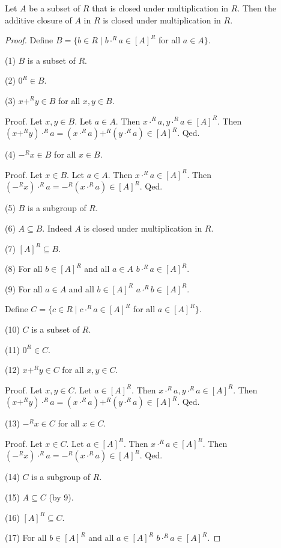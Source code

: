 \documentclass[english,11pt]{article}
\begin{document}
\begin{forthel}
\begin{lemma}
Let $A$ be a subset of $R$ that is closed under multiplication in $R$.
Then the additive closure of $A$ in $R$ is closed under multiplication in $R$.
\end{lemma}

\begin{proof}
Define $B = \{b \in R \mid b \cdot^{R} a \in [A]^{R}$ for all $a \in A\}$.

(1) $B$ is a subset of $R$.

(2) $0^{R} \in B$.

(3) $x +^{R} y \in B$ for all $x,y \in B$.

Proof.
Let $x,y \in B$.
Let $a \in A$. Then $x \cdot^{R} a, y \cdot^{R} a \in [A]^{R}$.
Then $(x +^{R} y) \cdot^{R} a = (x \cdot^{R} a) +^{R} (y \cdot^{R} a) \in [A]^{R}$.
Qed.

(4) $-^{R} x \in B$ for all $x \in B$.

Proof.
Let $x \in B$.
Let $a \in A$. Then $x \cdot^{R} a \in [A]^{R}$.
Then $(-^{R} x) \cdot^{R} a = -^{R} (x\cdot^{R} a) \in [A]^{R}$.
Qed.

(5) $B$ is a subgroup of $R$.

(6) $A \subseteq B$. Indeed $A$ is closed under multiplication in $R$.

(7) $[A]^{R} \subseteq B$.

(8) For all $b \in [A]^{R}$ and all $a \in A$ $b \cdot^{R} a \in [A]^{R}$.

(9) For all $a \in A$ and all $b \in [A]^{R}$  $a \cdot^{R} b \in [A]^{R}$.

Define $C = \{c \in R \mid c \cdot^{R} a \in [A]^{R}$ for all $a \in [A]^{R}\}$.

(10) $C$ is a subset of $R$.

(11) $0^{R} \in C$.

(12) $x +^{R} y \in C$ for all $x,y \in C$.

Proof.
Let $x,y \in C$.
Let $a \in [A]^{R}$. Then $x \cdot^{R} a, y \cdot^{R} a \in [A]^{R}$.
Then $(x +^{R} y) \cdot^{R} a = (x \cdot^{R} a) +^{R} (y \cdot^{R} a) \in [A]^{R}$.
Qed.

(13) $-^{R} x \in C$ for all $x \in C$.

Proof.
Let $x \in C$.
Let $a \in [A]^{R}$. Then $x \cdot^{R} a \in [A]^{R}$.
Then $(-^{R} x) \cdot^{R} a = -^{R} (x\cdot^{R} a) \in [A]^{R}$.
Qed.

(14) $C$ is a subgroup of $R$.

(15) $A \subseteq C$ (by 9). 

(16) $[A]^{R} \subseteq C$.

(17) For all $b \in [A]^{R}$ and all $a \in [A]^{R}$ $b \cdot^{R} a \in [A]^{R}$.

\end{proof}
\end{forthel}
\end{document}
